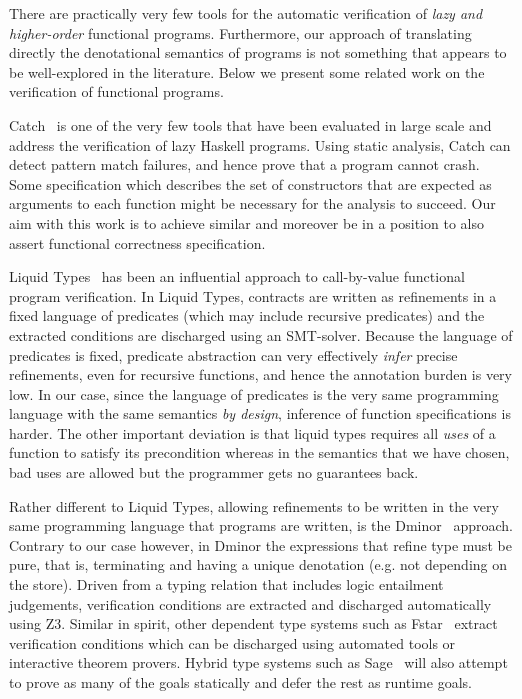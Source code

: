 There are practically very few tools for the automatic
verification of {\em lazy and higher-order} functional programs.
Furthermore, our approach of translating directly the denotational semantics of
programs is not something that appears to be well-explored in the literature.
Below we present some related work on the verification of functional programs.

Catch~\cite{Mitchell:2008:PBE:1411286.1411293} is one of the very few tools that
have been evaluated in large scale and address the verification of lazy Haskell
programs. Using static analysis, Catch can detect pattern match failures, and hence
prove that a program cannot crash. Some specification which describes the set of
constructors that are expected as arguments to each function might be
necessary for the analysis to succeed. Our aim with this work is to achieve similar and
moreover be in a position to also assert functional correctness specification.

Liquid Types~\cite{Rondon:2008:LT:1375581.1375602} has been an influential
approach to call-by-value functional program verification. In Liquid Types,
contracts are written as refinements in a fixed language of predicates (which may
include recursive predicates) and the extracted conditions are discharged using an
SMT-solver. Because the language of predicates is fixed, predicate abstraction can
very effectively {\em infer} precise refinements, even for recursive functions, and
hence the annotation burden is very low. In our case, since the language of predicates
is the very same programming language with the same semantics {\em by design}, inference
of function specifications is harder. The other important deviation is that liquid types
requires all {\em uses} of a function to satisfy its precondition whereas in the semantics
that we have chosen, bad uses are allowed but the programmer gets no guarantees back.

Rather different to Liquid Types, allowing refinements to be written
in the very same programming language that programs are written, is the
Dminor~\cite{Bierman+:subtyping} approach. Contrary to our case however, in Dminor
the expressions that refine type must be pure, that is, terminating and having a unique
denotation (e.g. not depending on the store). Driven from a typing relation that includes
logic entailment judgements, verification conditions are extracted and discharged automatically using Z3.
Similar in spirit, other dependent type systems such
as Fstar~\cite{fstar} extract verification conditions which can be discharged
using automated tools
or interactive theorem provers. Hybrid type systems such as Sage~\cite{Knowles+:sage}
will also attempt to prove as many of the goals statically and defer the rest as runtime
goals.

